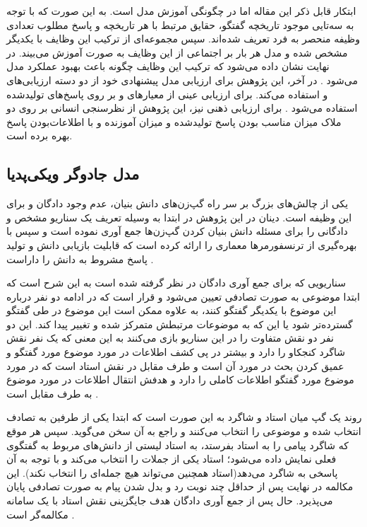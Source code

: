 ابتکار قابل ذکر این مقاله اما در چگونگی آموزش مدل است. به این صورت که با توجه به سه‌تایی موجود تاریخچه گفتگو، حقایق مرتبط با هر تاریخچه و پاسخ مطلوب تعدادی وظیفه منحصر به فرد تعریف شده‌اند. سپس مجموعه‌ای از ترکیب این وظایف با یکدیگر مشخص شده و مدل هر بار بر اجتماعی از این وظایف به صورت 
آموزش می‌بیند. در نهایت نشان داده می‌شود که ترکیب این وظایف چگونه باعث بهبود عملکرد مدل می‌شود
\cite{a_knowledge_grounded}
.
در آخر، این پژوهش برای ارزیابی مدل پیشنهادی خود از دو دسته ارزیابی‌های
و
استفاده می‌کند.
برای ارزیابی عینی از معیار‌های
و
بر روی پاسخ‌های تولیدشده استفاده می‌شود
\cite{papineni-etal-2002-bleu}
. برای ارزیابی ذهنی نیز، این پژوهش از نظرسنجی انسانی بر روی دو ملاک میزان مناسب بودن پاسخ تولیدشده و میزان آموزنده و با اطلاعات‌بودن پاسخ بهره برده است.


\subsection{مدل جادوگر ویکی‌پدیا} 

یکی از چالش‌های بزرگ بر سر راه گپ‌زن‌های دانش بنیان، عدم وجود دادگان و 
برای این وظیفه است. 
دینان در این پژوهش
در ابتدا به وسیله تعریف یک سناریو مشخص و 
دادگانی را برای مسئله دانش بنیان کردن گپ‌زن‌ها جمع آوری نموده است و سپس با بهره‌گیری از ترنسفورمر‌ها 
معماری را ارائه کرده است که قابلیت بازیابی دانش و تولید پاسخ مشروط به دانش را داراست
\cite{wizard}. 

سناریویی که برای جمع آوری دادگان در نظر گرفته شده است به این شرح است که ابتدا موضوعی به صورت تصادفی تعیین می‌شود و قرار است که در ادامه دو نفر درباره این موضوع با یکدیگر گفتگو کنند، به علاوه ممکن است این موضوع در طی گفتگو گسترده‌تر شود یا این که به موضوعات مرتبطش متمرکز شده و تغییر پیدا کند. این دو نفر دو نقش متفاوت را در این سناریو بازی می‌کنند به این معنی که یک نفر نقش شاگرد کنجکاو را دارد و بیشتر در پی کشف اطلاعات در مورد موضوع مورد گفتگو و عمیق کردن بحث در مورد آن است و طرف مقابل در نقش استاد است که در مورد موضوع مورد گفتگو اطلاعات کاملی را دارد و هدفش انتقال اطلاعات در مورد موضوع به طرف مقابل است
\cite{wizard}.

روند یک گپ‌ میان استاد و شاگرد به این صورت است که ابتدا یکی از طرفین به تصادف انتخاب شده و موضوعی را انتخاب می‌کنند و راجع به آن سخن می‌گوید. سپس هر موقع که شاگرد پیامی را به استاد بفرستد، به استاد لیستی از دانش‌های مربوط به گفتگوی فعلی نمایش‌ داده می‌شود؛ استاد یکی از جملات را انتخاب می‌کند و با توجه به آن پاسخی به شاگرد می‌دهد(استاد همچنین می‌تواند هیچ جمله‌ای را انتخاب نکند).
این مکالمه در نهایت پس از حداقل چند نوبت رد و بدل شدن پیام به صورت تصادفی پایان می‌پذیرد.
حال پس از جمع‌ آوری دادگان هدف جایگزینی نقش استاد با یک سامانه مکالمه‌گر است
\cite{wizard}
.

